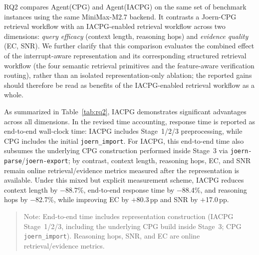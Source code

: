 \documentclass[conference]{IEEEtran}
\newcommand{\iacpg}{IACPG\xspace}
\begin{document}
RQ2 compares Agent(CPG) and Agent(IACPG) on the same set of benchmark instances using the same MiniMax-M2.7 backend. It contrasts a Joern-CPG retrieval workflow with an IACPG-enabled retrieval workflow across two dimensions: \textit{query efficacy} (context length, reasoning hops) and \textit{evidence quality} (EC, SNR). We further clarify that this comparison evaluates the combined effect of the interrupt-aware representation and its corresponding structured retrieval workflow (the four semantic retrieval primitives and the feature-aware verification routing), rather than an isolated representation-only ablation; the reported gains should therefore be read as benefits of the IACPG-enabled retrieval workflow as a whole.

As summarized in Table~\ref{tab:rq2}, IACPG demonstrates significant advantages across all dimensions. In the revised time accounting, response time is reported as end-to-end wall-clock time: IACPG includes Stage~1/2/3 preprocessing, while CPG includes the initial \texttt{joern\_import}. For IACPG, this end-to-end time also subsumes the underlying CPG construction performed inside Stage~3 via \texttt{joern-parse}/\texttt{joern-export}; by contrast, context length, reasoning hops, EC, and SNR remain online retrieval/evidence metrics measured after the representation is available. Under this mixed but explicit measurement scheme, IACPG reduces context length by $-$88.7\%, end-to-end response time by $-$88.4\%, and reasoning hops by $-$82.7\%, while improving EC by $+$80.3\,pp and SNR by $+$17.0\,pp.

\begin{table}[H]
  \centering
  \caption{RQ2: CPG vs.\ \iacpg in query efficacy and evidence quality.}
  \label{tab:rq2}
  \begin{quote}
    \footnotesize Note: End-to-end time includes representation construction (IACPG Stage~1/2/3, including the underlying CPG build inside Stage~3; CPG \texttt{joern\_import}). Reasoning hops, SNR, and EC are online retrieval/evidence metrics.
  \end{quote}
\end{table}
\end{document}
